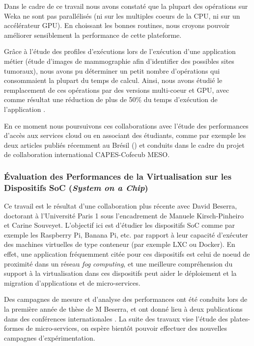 Dans le cadre de ce travail nous avons constaté que la plupart des opérations sur Weka ne sont pas parallélisés (ni sur les multiples c{oe}urs de la CPU, ni sur un accélérateur GPU). En choissant les bonnes routines, nous croyons pouvoir améliorer sensiblement la performance de cette plateforme.

Grâce à l'étude des profiles d'exécutions lors de l'exécution d'une application métier (étude d'images de mammographie afin d'identifier des possibles sites tumoraux), nous avons pu déterminer un petit nombre d'opérations qui consommaient la plupart du temps de calcul. Ainsi, nous avons étudié le remplacement de ces opérations par des versions multi-c{oe}ur et GPU, avec comme résultat une réduction de plus de 50\% du temps d'exécution de l'application \cite{Engel14a,Engel2015}.

En ce moment nous poursuivons ces collaborations avec l'étude des performances d'accès aux services cloud \cite{Charao17a}  ou en associant des étudiants, comme par exemple les deux articles publiés récemment au Brésil (\cite{Nesi17a, Muenchen17a}) et conduits dans le cadre du projet de collaboration international CAPES-Cofecub MESO.

\subsubsection*{Évaluation des Performances de la Virtualisation sur les Dispositifs SoC (\textit{System on a Chip})}

Ce travail est le résultat d'une collaboration plus récente avec David Beserra, doctorant à l'Université Paris 1 sous l'encadrement de Manuele Kirsch-Pinheiro et Carine Souveyet. L'objectif ici est d'étudier les dispositifs SoC comme par exemple les Raspberry Pi, Banana Pi, etc. par rapport à leur capacité d'exécuter des machines virtuelles de type conteneur (par exemple LXC ou Docker). En effet, une application fréquemment citée pour ces dispositifs est celui de n{oe}ud de proximité dans un réseau \textit{fog computing}, et une meilleure compréhension du support à la virtualisation dans ces dispositifs peut aider le déploiement et la migration d'applications et de micro-services.

Des campagnes de mesure et d'analyse des performances ont été conduits lors de la première année de thèse de M Beserra, et ont donné lieu à deux publications dans des conférences internationales \cite{Beserra17a, Beserra17b}. La suite des travaux vise l'étude des plates-formes de micro-services, on espère bientôt pouvoir effectuer des nouvelles campagnes d'expérimentation.